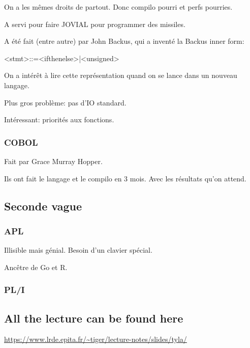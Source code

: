 \documentclass[a4paper,11pt]{article}
\begin{document}
On a les mêmes droits de partout. Donc compilo pourri et perfs pourries.

A servi pour faire JOVIAL pour programmer des missiles.

A été fait (entre autre) par John Backus, qui a inventé la Backus inner form:

<stmt>::=<ifthenelse>|<unsigned>

On a intérêt à lire cette représentation quand on se lance dans un nouveau
langage.

Plus gros problème: pas d'IO standard.

Intéressant: priorités aux fonctions.

\subsubsection{COBOL}

Fait par Grace Murray Hopper.

Ils ont fait le langage et le compilo en 3 mois. Avec les résultats qu'on
attend.

\subsection{Seconde vague}

\subsubsection{APL}

Illisible mais génial. Besoin d'un clavier spécial.

Ancêtre de Go et R.

\subsubsection{PL/I}

\subsection{All the lecture can be found here}
\url{https://www.lrde.epita.fr/~tiger/lecture-notes/slides/tyla/}
\end{document}
